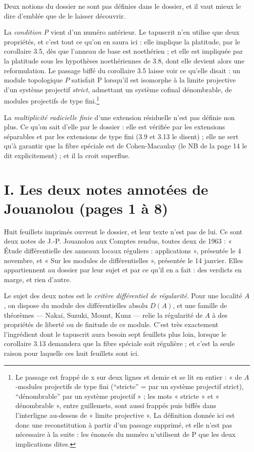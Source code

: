 \documentclass[11pt,a4paper]{article}
\begin{document}
Deux notions du dossier ne sont pas définies dans le dossier, et il vaut mieux
le dire d'emblée que de le laisser découvrir.

La \emph{condition P} vient d'un numéro antérieur. Le tapuscrit n'en
utilise que deux propriétés, et c'est tout ce qu'on en saura ici : elle
implique la platitude, par le corollaire 3.5, dès que l'anneau de base est
noethérien ; et elle est impliquée par la platitude sous les hypothèses
noethériennes de 3.8, dont elle devient alors une reformulation. Le passage
biffé du corollaire 3.5 laisse voir ce qu'elle disait : un module topologique
$P$ satisfait P lorsqu'il est isomorphe à la limite projective d'un système
projectif \emph{strict}, admettant un système cofinal dénombrable, de modules
projectifs de type fini.\footnote{Le passage est frappé de x sur deux lignes et
demie et se lit en entier : « de $A$-modules projectifs de type fini
(“stricte” = par un système projectif strict), “dénombrable” par un système
projectif » ; les mots « stricte » et « dénombrable », entre guillemets, sont
aussi frappés puis biffés dans l'interligne au-dessus de « limite projective ». La
définition donnée ici est donc une reconstitution à partir d'un passage
supprimé, et elle n'est pas nécessaire à la suite : les énoncés du numéro
n'utilisent de P que les deux implications dites.}

La \emph{multiplicité radicielle finie} d'une extension résiduelle n'est pas
définie non plus. Ce qu'on sait d'elle par le dossier : elle est vérifiée par
les extensions séparables et par les extensions de type fini (3.9 et 3.13 le
disent) ; elle ne sert qu'à garantir que la fibre spéciale est de
Cohen-Macaulay (le NB de la page 14 le dit explicitement) ; et il la croit
superflue.

\section*{I. Les deux notes annotées de Jouanolou (pages 1 à 8)}

Huit feuillets imprimés ouvrent le dossier, et leur texte n'est pas de lui. Ce
sont deux notes de J.-P. Jouanolou aux Comptes rendus, toutes deux de 1963 :
« Étude différentielle des anneaux locaux réguliers : applications », présentée
le 4 novembre, et « Sur les modules de différentielles », présentée le 14
janvier. Elles appartiennent au dossier par leur sujet et par ce qu'il en a
fait : des verdicts en marge, et rien d'autre.

Le sujet des deux notes est le \emph{critère différentiel de régularité}. Pour
une localité $A$, on dispose du module des différentielles absolu $D(A)$, et
une famille de théorèmes — Nakai, Suzuki, Mount, Kunz — relie la régularité de
$A$ à des propriétés de liberté ou de finitude de ce module. C'est très
exactement l'ingrédient dont le tapuscrit aura besoin sept feuillets plus loin,
lorsque le corollaire 3.13 demandera que la fibre spéciale soit régulière ; et
c'est la seule raison pour laquelle ces huit feuillets sont ici.
\end{document}
